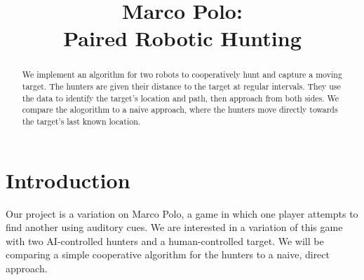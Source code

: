 \documentclass[conference]{IEEEtran}
\begin{document}
%
\title{Marco Polo:\\ Paired Robotic Hunting}


\author{
\and
{}
\and
{}
\and
{}
}

\maketitle

\begin{abstract}
We implement an algorithm for two robots to cooperatively hunt and capture a moving target.
The hunters are given their distance to the target at regular intervals.
They use the data to identify the target's location and path, then approach from both sides.
We compare the alogorithm to a naive approach, where the hunters move directly towards the target's last known location.
\end{abstract}


\section{Introduction}
Our project is a variation on Marco Polo, a game in which one player attempts to find another using auditory cues.
We are interested in a variation of this game with two AI-controlled hunters and a human-controlled target.
We will be comparing a simple cooperative algorithm for the hunters to a naive, direct approach.
\end{document}
